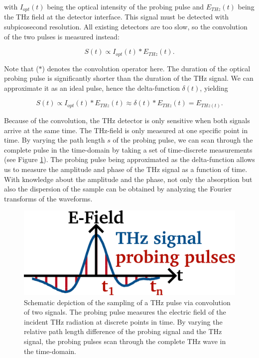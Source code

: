 with $I_{opt}(t)$ being the optical intensity of the probing pulse and $E_{THz}(t)$ being the THz field at the detector interface. This signal must be detected with subpicosecond resolution. All existing detectors are too slow, so the convolution of the two pulses is measured instead: 

\begin{equation}
	S(t) \propto I_{opt}(t) \ast E_{THz}(t).
\end{equation}

Note that ($\ast$) denotes the convolution operator here. The duration of the optical probing pulse is significantly shorter than the duration of the THz signal. We can approximate it as an ideal pulse, hence the delta-function $\delta(t)$, yielding

\begin{equation}
	S(t) \propto I_{opt}(t) \ast E_{THz}(t) \approx \delta(t) \ast E_{THz}(t) = E_{THz(t)}.
\end{equation}

Because of the convolution, the THz detector is only sensitive when both signals arrive at the same time. The THz-field is only measured at one specific point in time. By varying the path length $s$ of the probing pulse, we can scan through the complete pulse in the time-domain by taking a set of time-discrete measurements (see Figure \ref{fig:convo}). The probing pulse being approximated as the delta-function allows us to measure the amplitude and phase of the THz signal as a function of time. With knowledge about the amplitude and the phase, not only the absorption but also the dispersion of the sample can be obtained by analyzing the Fourier transforms of the waveforms. 

\begin{figure}[!]
  \centering
    \centering
    \includegraphics[width=0.4\linewidth]{figures/theory/TDS_basics.pdf}
    \caption{Schematic depiction of the sampling of a THz pulse via convolution of two signals. The probing pulse measures the electric field of the incident THz radiation at discrete points in time. By varying the relative path length difference of the probing signal and the THz signal, the probing pulses scan through the complete THz wave in the time-domain.} 
    \label{fig:convo}
\end{figure}